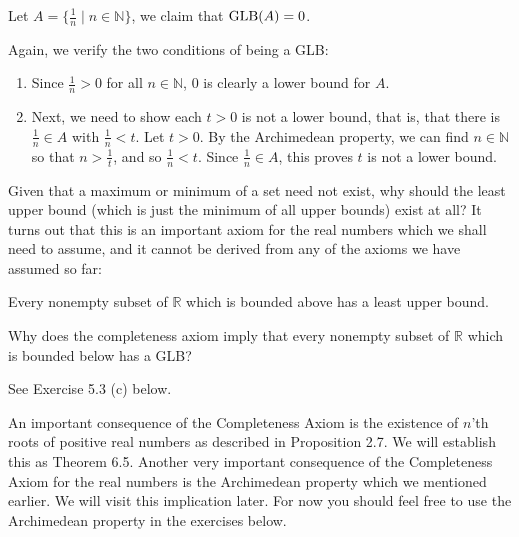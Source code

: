 \documentclass[11pt,dvipsnames]{book}
\numberwithin{equation}{section} %
\numberwithin{figure}{section} %
\numberwithin{table}{section} %
\begin{document}
\begin{example}
Let $A=\{\frac{1}{n} \; | \; n\in\mathbb{N}\}$, we claim that ${\rm GLB}(A)=0$. 

Again, we verify the two conditions of being a GLB:
\begin{enumerate}[label=(\alph*)]
\item Since $\frac{1}{n}>0$ for all $n\in\mathbb{N}$, $0$ is clearly a lower bound for $A$.
\item Next, we need to show each $t>0$ is not a lower bound, that is, that there is $\frac{1}{n} \in A$ with $\frac{1}{n}<t$. Let $t>0$. By the Archimedean property, we can find $n\in\mathbb{N}$ so that $n>\frac{1}{t}$, and so $\frac{1}{n}<t$. Since $\frac{1}{n}\in A$, this proves $t$ is not a lower bound. 
\end{enumerate}
\end{example}



Given that a maximum or minimum of a set need not exist, why should the least upper bound (which is just the minimum of all upper bounds) exist at all? It turns out that this is an important axiom for the real numbers which we shall need to assume, and it cannot be derived from any of the axioms we have assumed so far:\\

\begin{tcolorbox}
{ Every nonempty subset of $\mathbb{R}$ which is bounded above has a least upper bound. \\}
\end{tcolorbox}

\begin{exercise}
Why does the completeness axiom imply that every nonempty subset of $\mathbb{R}$ which is bounded below has a GLB?
\begin{solution}
See Exercise 5.3 (c) below.
\end{solution}
\end{exercise}
An important consequence of the Completeness Axiom is the existence of $n$'th roots of positive real numbers as described in Proposition 2.7. We will establish this as Theorem 6.5. Another very important consequence of the Completeness Axiom for the real numbers is the Archimedean property which we mentioned earlier. We will visit this implication later. For now you should feel free to use the Archimedean property in the exercises below. 
%
%
%
%
\end{document}
